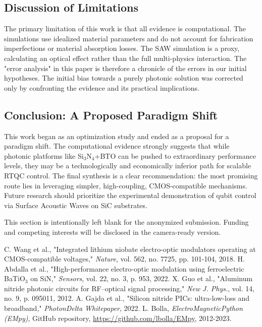 \documentclass{article}
\begin{document}
\subsection{Discussion of Limitations}
The primary limitation of this work is that all evidence is computational. The simulations use idealized material parameters and do not account for fabrication imperfections or material absorption losses. The SAW simulation is a proxy, calculating an optical effect rather than the full multi-physics interaction. The "error analysis" in this paper is therefore a chronicle of the errors in our initial hypotheses. The initial bias towards a purely photonic solution was corrected only by confronting the evidence and its practical implications.

\subsection{Conclusion: A Proposed Paradigm Shift}
This work began as an optimization study and ended as a proposal for a paradigm shift. The computational evidence strongly suggests that while photonic platforms like Si$_3$N$_4$+BTO can be pushed to extraordinary performance levels, they may be a technologically and economically inferior path for scalable RTQC control. The final synthesis is a clear recommendation: the most promising route lies in leveraging simpler, high-coupling, CMOS-compatible mechanisms. Future research should prioritize the experimental demonstration of qubit control via Surface Acoustic Waves on SiC substrates.

\begin{ack}
This section is intentionally left blank for the anonymized submission. Funding and competing interests will be disclosed in the camera-ready version.
\end{ack}

\begin{thebibliography}{99}
C. Wang et al., "Integrated lithium niobate electro-optic modulators operating at CMOS-compatible voltages," \textit{Nature}, vol. 562, no. 7725, pp. 101-104, 2018.
H. Abdalla et al., "High-performance electro-optic modulation using ferroelectric BaTiO$_3$ on SiN," \textit{Sensors}, vol. 22, no. 3, p. 953, 2022.
X. Guo et al., "Aluminum nitride photonic circuits for RF–optical signal processing," \textit{New J. Phys.}, vol. 14, no. 9, p. 095011, 2012.
A. Gajda et al., "Silicon nitride PICs: ultra-low-loss and broadband," \textit{PhotonDelta Whitepaper}, 2022.
L. Bolla, \textit{ElectroMagneticPython (EMpy)}, GitHub repository, \url{https://github.com/lbolla/EMpy}, 2012-2023.
\end{thebibliography}
\end{document}
